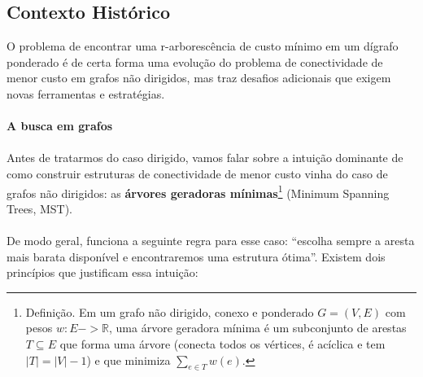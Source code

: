 \documentclass[12pt,a4paper]{article}
\def\emph#1{#1}%
\def\to{->}%
\begin{document}
\subsection{Contexto Histórico}
O problema de encontrar uma r-arborescência de custo mínimo em um dígrafo ponderado é de certa forma uma evolução do problema de conectividade de menor custo em grafos não dirigidos, mas traz desafios adicionais que exigem novas ferramentas e estratégias.

\paragraph{A busca em grafos}

\paragraph{}
Antes de tratarmos do caso \emph{dirigido}, vamos falar sobre a intuição dominante de \emph{como construir estruturas de conectividade de menor custo} vinha do caso de \emph{grafos não dirigidos}: as \textbf{árvores geradoras mínimas}\footnote{Definição. Em um grafo não dirigido, conexo e ponderado \(G=(V,E)\) com pesos \(w:E\to\mathbb{R}\), uma árvore geradora mínima é um subconjunto de arestas \(T\subseteq E\) que forma uma árvore (conecta todos os vértices, é acíclica e tem \(|T|=|V|-1\)) e que minimiza \(\sum_{e\in T} w(e)\).} (\emph{Minimum Spanning Trees}, MST).

\paragraph{}
De modo geral, funciona a seguinte regra para esse caso: “escolha sempre a aresta mais barata disponível e encontraremos uma estrutura ótima”. Existem dois princípios que justificam essa intuição:
\end{document}
